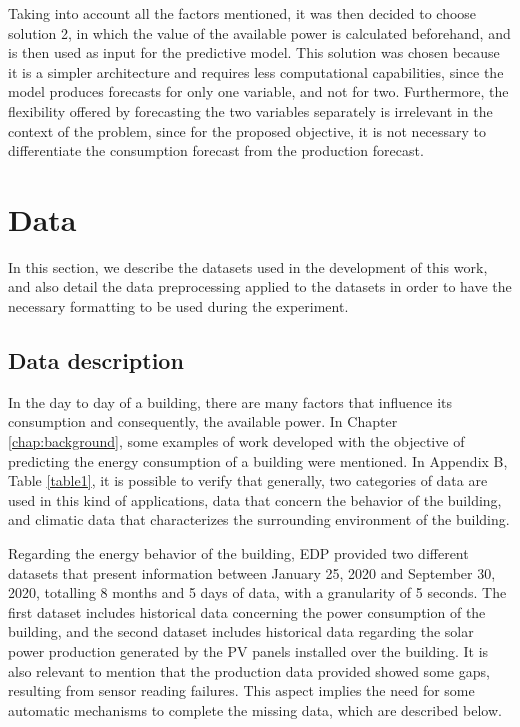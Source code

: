 Taking into account all the factors mentioned, it was then decided to choose solution 2, in which the value of the available power is calculated beforehand, and is then used as input for the predictive model. This solution was chosen because it is a simpler architecture and requires less computational capabilities, since the model produces forecasts for only one variable, and not for two. Furthermore, the flexibility offered by forecasting the two variables separately is irrelevant in the context of the problem, since for the proposed objective, it is not necessary to differentiate the consumption forecast from the production forecast. 

\section{Data}\label{chap3:sec:data}

In this section, we describe the datasets used in the development of this work, and also detail the data preprocessing applied to the datasets in order to have the necessary formatting to be used during the experiment.

\subsection{Data description}\label{chap3:subsec:data_description}

In the day to day of a building, there are many factors that influence its consumption and consequently, the available power. In Chapter \ref{chap:background}, some examples of work developed with the objective of predicting the energy consumption of a building were mentioned. In Appendix B, Table \ref{table1}, it is possible to verify that generally, two categories of data are used in this kind of applications, data that concern the behavior of the building, and climatic data that characterizes the surrounding environment of the building.

Regarding the energy behavior of the building, \ac{EDP} provided two different datasets that present information between January 25, 2020 and September 30, 2020, totalling 8 months and 5 days of data, with a granularity of 5 seconds. The first dataset includes historical data concerning the power consumption of the building, and the second dataset includes historical data regarding the solar power production generated by the \ac{PV} panels installed over the building. It is also relevant to mention that the production data provided showed some gaps, resulting from sensor reading failures. This aspect implies the need for some automatic mechanisms to complete the missing data, which are described below.


